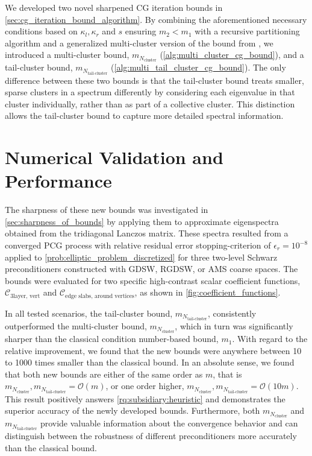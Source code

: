We developed two novel sharpened CG iteration bounds in \cref{sec:cg_iteration_bound_algorithm}. By combining the aforementioned necessary conditions based on $\kappa_l,\kappa_r$ and $s$ ensuring $m_2 < m_1$ with a recursive partitioning algorithm and a generalized multi-cluster version of the bound from \cite{cg_sharpened_convrate_Axelsson1976}, we introduced a multi-cluster bound, $m_{N_{\text{cluster}}}$ (\cref{alg:multi_cluster_cg_bound}), and a tail-cluster bound, $m_{N_{\text{tail-cluster}}}$ (\cref{alg:multi_tail_cluster_cg_bound}). The only difference between these two bounds is that the tail-cluster bound treats smaller, sparse clusters in a spectrum differently by considering each eigenvalue in that cluster individually, rather than as part of a collective cluster. This distinction allows the tail-cluster bound to capture more detailed spectral information.

\section{Numerical Validation and Performance}
The sharpness of these new bounds was investigated in \cref{sec:sharpness_of_bounds} by applying them to approximate eigenspectra obtained from the tridiagonal Lanczos matrix. These spectra resulted from a converged PCG process with relative residual error stopping-criterion of $\epsilon_r=10^{-8}$ applied to \cref{prob:elliptic_problem_discretized} for three two-level Schwarz preconditioners constructed with GDSW, RGDSW, or AMS coarse spaces. The bounds were evaluated for two specific high-contrast scalar coefficient functions, $\mathcal{C}_{\text{3layer, vert}}$ and $\mathcal{C}_{\text{edge slabs, around vertices}}$, as shown in \cref{fig:coefficient_functions}.

In all tested scenarios, the tail-cluster bound, $m_{N_{\text{tail-cluster}}}$, consistently outperformed the multi-cluster bound, $m_{N_{\text{cluster}}}$, which in turn was significantly sharper than the classical condition number-based bound, $m_1$. With regard to the relative improvement, we found that the new bounds were anywhere between 10 to 1000 times smaller than the classical bound. In an absolute sense, we found that both new bounds are either of the same order as $m$, that is $m_{N_{\text{cluster}}}, m_{N_{\text{tail-cluster}}} = \mathcal{O}(m)$, or one order higher, $m_{N_{\text{cluster}}}, m_{N_{\text{tail-cluster}}} = \mathcal{O}(10m)$. This result positively answers \ref{rq:subsidiary:heuristic} and demonstrates the superior accuracy of the newly developed bounds. Furthermore, both $m_{N_{\text{cluster}}}$ and $m_{N_{\text{tail-cluster}}}$ provide valuable information about the convergence behavior and can distinguish between the robustness of different preconditioners more accurately than the classical bound.

